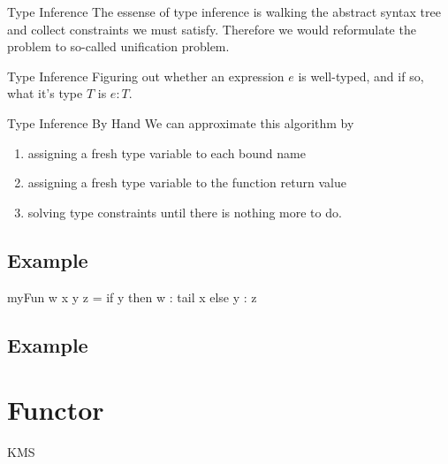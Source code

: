\documentclass[openany, 12pt]{book}
\begin{document}
\begin{intuition}{Type Inference}
  The essense of type inference is walking the abstract syntax tree and
  collect constraints we must satisfy. Therefore we would reformulate the
  problem to so-called unification problem.
\end{intuition}

\begin{definition}{Type Inference}{}
  Figuring out whether an expression $e$ is well-typed, and if so, what it's
  type $T$ is $e: T$.
\end{definition}

\begin{definition}{Type Inference By Hand}{}
  We can approximate this algorithm by
  \begin{enumerate}
    \item assigning a fresh type variable to each bound name
    \item assigning a fresh type variable to the function return value
    \item solving type constraints until there is nothing more to do.
  \end{enumerate}
\end{definition}

\section{Example}
\begin{haskell}{}
myFun w x y z = if y then w : tail x else y : z
\end{haskell}

\section{Example}

\chapter{Functor}
\gls{KMS}
\glsaddallunused{}

\clearpage
\printglossaries

\printindex{}
\end{document}
